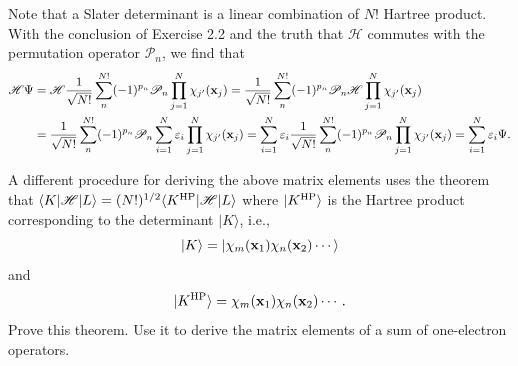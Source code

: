 \documentclass[a4paper]{book}
\newcounter{exercise}[chapter]
\newcounter{solution}[chapter]
\newcommand{\bfx}{{\bf x}}
\begin{document}
	\begin{solution}
	
	Note that a Slater determinant is a linear combination of $N!$ Hartree product. With the conclusion of Exercise 2.2 and the truth that $\mathscr{H}$ commutes with the permutation operator $\mathscr{P}_n$, we find that
	\begin{align*}
		\mathscr{H} \Psi &= \mathscr{H} \frac{1}{\sqrt{N!}} \sum_{ n }^{ N!} (-1)^{p_n} \mathscr{P}_n \prod_{ j=1 }^N \chi_{j^\prime}( \bfx_j ) = \frac{1}{\sqrt{N!}} \sum_{ n }^{ N!} (-1)^{p_n} \mathscr{P}_n \mathscr{H} \prod_{ j=1 }^N \chi_{j^\prime}( \bfx_j ) \\
		&= \frac{1}{\sqrt{N!}} \sum_{ n }^{ N!} (-1)^{p_n} \mathscr{P}_n \sum_{ i=1 }^N \varepsilon_i \prod_{ j=1 }^N \chi_{j^\prime}( \bfx_j ) = \sum_{ i=1 }^N \varepsilon_i \frac{1}{\sqrt{N!}} \sum_{ n }^{ N!} (-1)^{p_n} \mathscr{P}_n \prod_{ j=1 }^N \chi_{j^\prime}( \bfx_j ) = \sum_{ i=1 }^N \varepsilon_i \Psi .
	\end{align*}
	
	\end{solution}
	
	\begin{exercise}
	A different procedure for deriving the above matrix elements uses the theorem that $\langle K | \mathscr{H} | L \rangle = (N!)^{1/2} \langle K^{\rm HP} | \mathscr{H} | L \rangle$ where $|K^{\rm HP} \rangle$ is the Hartree product corresponding to the determinant $| K \rangle$, i.e.,
	\[
		| K \rangle = | \chi_m( \bfx_1 ) \chi_n( \bfx_2 ) \cdots \rangle
	\]
	and
	\[
		| K^{\rm HP} \rangle = \chi_m( \bfx_1 ) \chi_n( \bfx_2 ) \cdots.
	\]
	Prove this theorem. Use it to derive the matrix elements of a sum of one-electron operators.
	\end{exercise}
	
\end{document}
